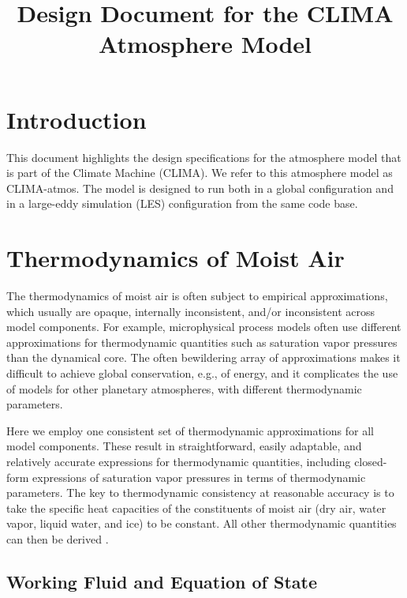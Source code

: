 \documentclass{article}
\title{Design Document for the CLIMA Atmosphere Model}
\author{ }
\begin{document}
\maketitle
\tableofcontents

\section{Introduction}
\label{sec:introduction}

This document highlights the design specifications for the atmosphere model that is part of the Climate Machine (CLIMA). We refer to this atmosphere model as CLIMA-atmos. The model is designed to run both in a global configuration and in a large-eddy simulation (LES) configuration from the same code base.  

\section{Thermodynamics of Moist Air}\label{s:thermodynamics}

The thermodynamics of moist air is often subject to empirical approximations, which usually are opaque, internally inconsistent, and/or inconsistent across model components. For example, microphysical process models often use different approximations for thermodynamic quantities such as saturation vapor pressures than the dynamical core. The often bewildering array of approximations makes it difficult to achieve global conservation, e.g., of energy, and it complicates the use of models for other planetary atmospheres, with different thermodynamic parameters. 

Here we employ one consistent set of thermodynamic approximations for all model components. These result in straightforward, easily adaptable, and relatively accurate expressions for thermodynamic quantities, including closed-form expressions of saturation vapor pressures in terms of thermodynamic parameters. The key to thermodynamic consistency at reasonable accuracy is to take the specific heat capacities of the constituents of moist air (dry air, water vapor, liquid water, and ice) to be constant. All other thermodynamic quantities can then be derived \citep[cf.][]{Romps08a,Marquet16a}. 

\subsection{Working Fluid and Equation of State}
\end{document}
